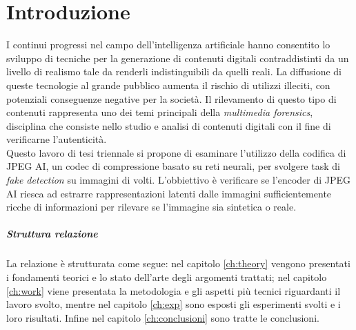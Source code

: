 \chapter*{Introduzione}\label{ch:intro}
I continui progressi nel campo dell'intelligenza artificiale hanno consentito lo sviluppo di tecniche per la generazione di contenuti digitali contraddistinti da un livello di realismo tale da renderli indistinguibili da quelli reali. La diffusione di queste tecnologie al grande pubblico aumenta il rischio di utilizzi illeciti, con potenziali conseguenze negative per la società. Il rilevamento di questo tipo di contenuti rappresenta uno dei temi principali della \textit{multimedia forensics}, disciplina che consiste nello studio e analisi di contenuti digitali con il fine di verificarne l'autenticità.\\
Questo lavoro di tesi triennale si propone di esaminare l'utilizzo della codifica di JPEG AI, un codec di compressione basato su reti neurali, per svolgere task di \textit{fake detection} su immagini di volti. L'obbiettivo  è verificare se l'encoder di JPEG AI riesca ad estrarre rappresentazioni latenti dalle immagini sufficientemente ricche di informazioni per rilevare se l'immagine sia sintetica o reale.
\paragraph{Struttura relazione}
La relazione è strutturata come segue: nel capitolo \ref{ch:theory} vengono presentati i fondamenti teorici e lo stato dell'arte degli argomenti trattati; nel capitolo \ref{ch:work} viene presentata la metodologia e gli aspetti più tecnici riguardanti il lavoro svolto, mentre nel capitolo \ref{ch:exp} sono esposti gli esperimenti svolti e i loro risultati. Infine nel capitolo \ref{ch:conclusioni} sono tratte le conclusioni.

